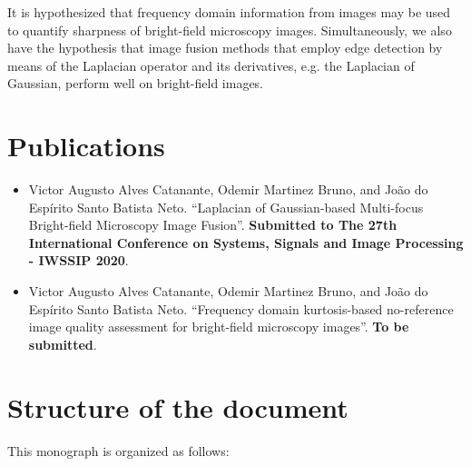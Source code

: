 It is hypothesized that frequency domain information from images may be used to quantify sharpness of bright-field microscopy images. Simultaneously, we also have the hypothesis that image fusion methods that employ edge detection by means of the Laplacian operator and its derivatives, e.g. the Laplacian of Gaussian, perform well on bright-field images. 

\section{Publications}

\begin{itemize}
    \item Victor Augusto Alves Catanante, Odemir Martinez Bruno, and João do Espírito Santo Batista Neto. ``Laplacian of Gaussian-based Multi-focus Bright-field Microscopy Image Fusion''. \textbf{Submitted to The 27th International Conference on Systems, Signals and Image Processing - IWSSIP 2020}.
    
    \item \cite{catanante2020frequency} Victor Augusto Alves Catanante, Odemir Martinez Bruno, and João do Espírito Santo Batista Neto. ``Frequency domain kurtosis-based no-reference image quality assessment for bright-field microscopy images''. \textbf{To be submitted}.
\end{itemize}

\section*{Structure of the document}

This monograph is organized as follows:

